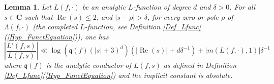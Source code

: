 \documentclass[a4paper,10pt]{amsart}
\theoremstyle{plain}
\newtheorem{lem}[theo]{Lemma}
\theoremstyle{definition}
\begin{document}
\begin{lem}\label{Lm_boundlogder}
Let $L(f,\cdot)$ be an analytic $L$-function of degree $d$ and $\delta >0$. 
For all $s\in\mathbf{C}$ such that $\operatorname{Re}(s)\leq 2$, 
and $\lvert s - \rho\rvert > \delta$, for every zero or pole $\rho$ of $\Lambda(f,\cdot)$ (the completed $L$-function, see Definition \ref{Def_Lfunc}(\ref{Hyp_FunctEquation})), one has
$$\left\lvert \frac{L'(f,s)}{L(f,s)} \right\rvert \ll 
\log\left( \mathfrak{q}(f)(\lvert s\rvert +3)^{d}\right)(\lvert\operatorname{Re}(s)\rvert +  d\delta^{-1}) + \lvert m(L(f,\cdot),1) \rvert \delta^{-1}$$
where $\mathfrak{q}(f)$ is the analytic conductor of $L(f,s)$ as defined in Definition \ref{Def_Lfunc}(\ref{Hyp_FunctEquation}) and the implicit constant is absolute.
\end{lem}
\end{document}
